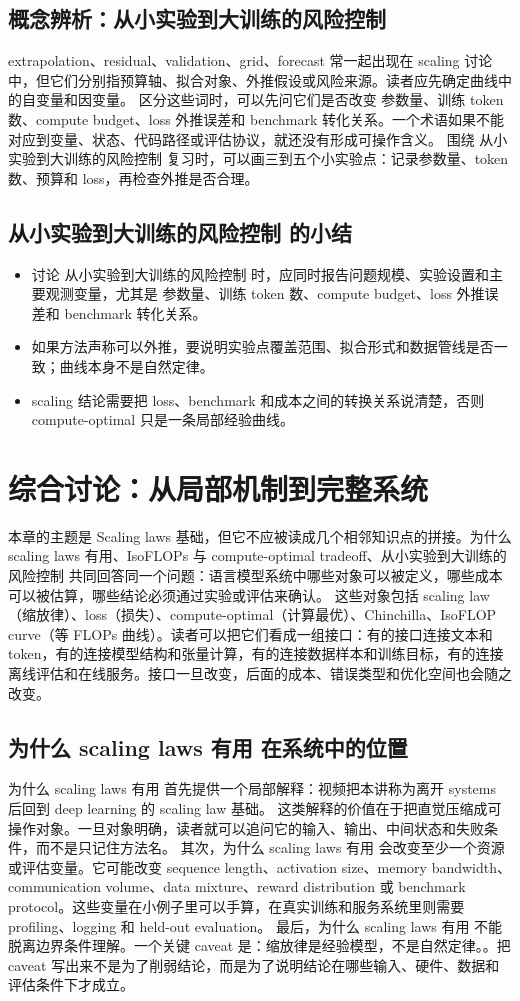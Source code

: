 \documentclass[a4paper]{article}
\begin{document}
\subsection{概念辨析：从小实验到大训练的风险控制}
extrapolation、residual、validation、grid、forecast 常一起出现在 scaling 讨论中，但它们分别指预算轴、拟合对象、外推假设或风险来源。读者应先确定曲线中的自变量和因变量。
区分这些词时，可以先问它们是否改变 参数量、训练 token 数、compute budget、loss 外推误差和 benchmark 转化关系。一个术语如果不能对应到变量、状态、代码路径或评估协议，就还没有形成可操作含义。
围绕 从小实验到大训练的风险控制 复习时，可以画三到五个小实验点：记录参数量、token 数、预算和 loss，再检查外推是否合理。
\subsection{从小实验到大训练的风险控制 的小结}
\begin{itemize}
\item 讨论 从小实验到大训练的风险控制 时，应同时报告问题规模、实验设置和主要观测变量，尤其是 参数量、训练 token 数、compute budget、loss 外推误差和 benchmark 转化关系。
\item 如果方法声称可以外推，要说明实验点覆盖范围、拟合形式和数据管线是否一致；曲线本身不是自然定律。
\item scaling 结论需要把 loss、benchmark 和成本之间的转换关系说清楚，否则 compute-optimal 只是一条局部经验曲线。
\end{itemize}
\section{综合讨论：从局部机制到完整系统}
本章的主题是 Scaling laws 基础，但它不应被读成几个相邻知识点的拼接。为什么 scaling laws 有用、IsoFLOPs 与 compute-optimal tradeoff、从小实验到大训练的风险控制 共同回答同一个问题：语言模型系统中哪些对象可以被定义，哪些成本可以被估算，哪些结论必须通过实验或评估来确认。
这些对象包括 scaling law（缩放律）、loss（损失）、compute-optimal（计算最优）、Chinchilla、IsoFLOP curve（等 FLOPs 曲线）。读者可以把它们看成一组接口：有的接口连接文本和 token，有的连接模型结构和张量计算，有的连接数据样本和训练目标，有的连接离线评估和在线服务。接口一旦改变，后面的成本、错误类型和优化空间也会随之改变。
\subsection{为什么 scaling laws 有用 在系统中的位置}
为什么 scaling laws 有用 首先提供一个局部解释：视频把本讲称为离开 systems 后回到 deep learning 的 scaling law 基础。 这类解释的价值在于把直觉压缩成可操作对象。一旦对象明确，读者就可以追问它的输入、输出、中间状态和失败条件，而不是只记住方法名。
其次，为什么 scaling laws 有用 会改变至少一个资源或评估变量。它可能改变 sequence length、activation size、memory bandwidth、communication volume、data mixture、reward distribution 或 benchmark protocol。这些变量在小例子里可以手算，在真实训练和服务系统里则需要 profiling、logging 和 held-out evaluation。
最后，为什么 scaling laws 有用 不能脱离边界条件理解。一个关键 caveat 是：缩放律是经验模型，不是自然定律。。把 caveat 写出来不是为了削弱结论，而是为了说明结论在哪些输入、硬件、数据和评估条件下才成立。
\end{document}
